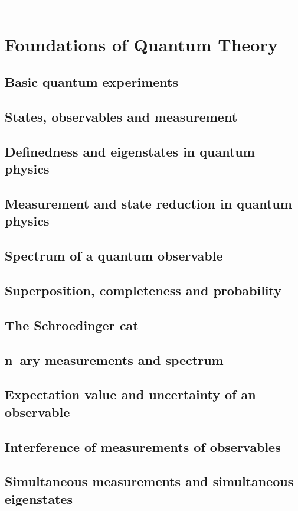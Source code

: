 \documentclass{article}
\begin{document}
-----------------------------------------------
\section{Foundations of Quantum Theory}
\subsection{Basic quantum experiments}
\subsection{States, observables and measurement}
\subsection{Definedness and eigenstates in quantum physics}
\subsection{Measurement and state reduction in quantum physics}
\subsection{Spectrum of a quantum observable}
\subsection{Superposition, completeness and probability}
\subsection{The Schroedinger cat}
\subsection{n–ary measurements and spectrum}
\subsection{Expectation value and uncertainty of an observable}
\subsection{Interference of measurements of observables}
\subsection{Simultaneous measurements and simultaneous eigenstates}
\end{document}
